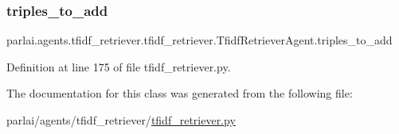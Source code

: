 \subsubsection{\texorpdfstring{triples\+\_\+to\+\_\+add}{triples\_to\_add}}
{\footnotesize\ttfamily parlai.\+agents.\+tfidf\+\_\+retriever.\+tfidf\+\_\+retriever.\+Tfidf\+Retriever\+Agent.\+triples\+\_\+to\+\_\+add}



Definition at line 175 of file tfidf\+\_\+retriever.\+py.



The documentation for this class was generated from the following file\+:\begin{DoxyCompactItemize}
\item 
parlai/agents/tfidf\+\_\+retriever/\hyperlink{agents_2tfidf__retriever_2tfidf__retriever_8py}{tfidf\+\_\+retriever.\+py}\end{DoxyCompactItemize}
